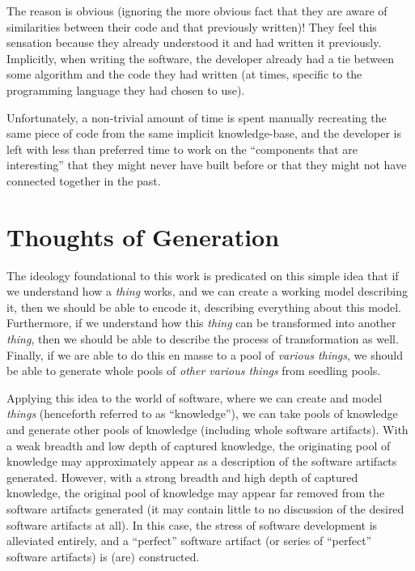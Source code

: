 The reason is obvious (ignoring the more obvious fact that they are aware of
similarities between their code and that previously written)! They feel this
sensation because they already understood it and had written it previously.
Implicitly, when writing the software, the developer already had a tie between
some algorithm and the code they had written (at times, specific to the
programming language they had chosen to use).

Unfortunately, a non-trivial amount of time is spent manually recreating the
same piece of code from the same implicit knowledge-base, and the developer is
left with less than preferred time to work on the ``components that are
interesting'' that they might never have built before or that they might not
have connected together in the past.

\section{Thoughts of Generation}\label{sec:idlgy:thoughts_of_generation}

The ideology foundational to this work is predicated on this simple idea that if
we understand how a \textit{thing} works, and we can create a working model
describing it, then we should be able to encode it, describing everything about
this model. Furthermore, if we understand how this \textit{thing} can be
transformed into another \textit{thing}, then we should be able to describe the
process of transformation as well. Finally, if we are able to do this en masse
to a pool of \textit{various things}, we should be able to generate whole pools
of \textit{other various things} from seedling pools.

Applying this idea to the world of software, where we can create and model
\textit{things} (henceforth referred to as ``knowledge''), we can take pools of
knowledge and generate other pools of knowledge (including whole software
artifacts). With a weak breadth and low depth of captured knowledge, the
originating pool of knowledge may approximately appear as a description of the
software artifacts generated. However, with a strong breadth and high depth of
captured knowledge, the original pool of knowledge may appear far removed from
the software artifacts generated (it may contain little to no discussion of the
desired software artifacts at all). In this case, the stress of software
development is alleviated entirely, and a ``perfect'' software artifact (or
series of ``perfect'' software artifacts) is (are) constructed.

